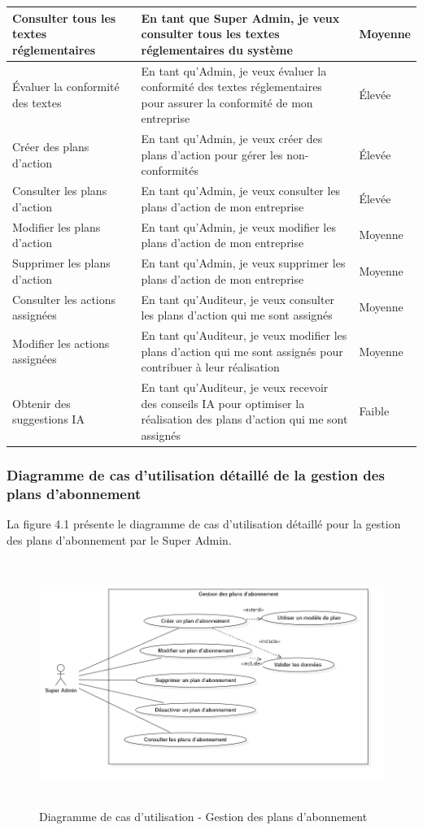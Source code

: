 \begin{longtable}{|>{\raggedright\arraybackslash}p{4cm}|>{\raggedright\arraybackslash}p{7cm}|>{\raggedright\arraybackslash}p{2cm}|}
\hline
Consulter tous les textes réglementaires & En tant que Super Admin, je veux consulter tous les textes réglementaires du système & Moyenne \\
\hline
Évaluer la conformité des textes & En tant qu'Admin, je veux évaluer la conformité des textes réglementaires pour assurer la conformité de mon entreprise & Élevée \\
\hline
Créer des plans d'action & En tant qu'Admin, je veux créer des plans d'action pour gérer les non-conformités & Élevée \\
\hline
Consulter les plans d'action & En tant qu'Admin, je veux consulter les plans d'action de mon entreprise & Élevée \\
\hline
Modifier les plans d'action & En tant qu'Admin, je veux modifier les plans d'action de mon entreprise & Moyenne \\
\hline
Supprimer les plans d'action & En tant qu'Admin, je veux supprimer les plans d'action de mon entreprise & Moyenne \\
\hline
Consulter les actions assignées & En tant qu'Auditeur, je veux consulter les plans d'action qui me sont assignés & Moyenne \\
\hline
Modifier les actions assignées & En tant qu'Auditeur, je veux modifier les plans d'action qui me sont assignés pour contribuer à leur réalisation & Moyenne \\
\hline
Obtenir des suggestions IA & En tant qu'Auditeur, je veux recevoir des conseils IA pour optimiser la réalisation des plans d'action qui me sont assignés & Faible \\
\hline
\end{longtable}


\subsubsection{Diagramme de cas d'utilisation détaillé de la gestion des plans d'abonnement}
\noindent La figure 4.1 présente le diagramme de cas d'utilisation détaillé pour la gestion des plans d'abonnement par le Super Admin.

\begin{figure}[H]
    \centering
    \includegraphics[width=12cm,height=8cm]{images/plansubscriptionuc.png}
    \caption{Diagramme de cas d'utilisation - Gestion des plans d'abonnement}
\end{figure}

